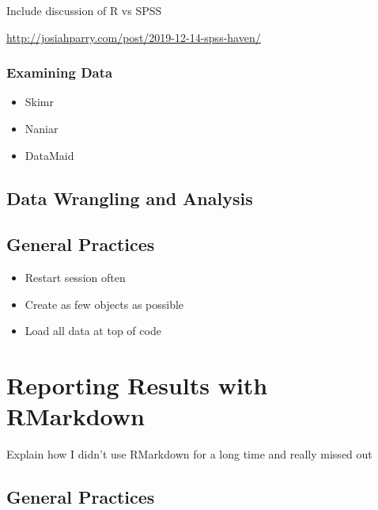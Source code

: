 \documentclass[]{book}
\providecommand{\tightlist}{%
  \setlength{\itemsep}{0pt}\setlength{\parskip}{0pt}}
\begin{document}
Include discussion of R vs SPSS

\url{http://josiahparry.com/post/2019-12-14-spss-haven/}

\hypertarget{examining-data}{%
\subsection{Examining Data}\label{examining-data}}

\begin{itemize}
\tightlist
\item
  Skimr
\item
  Naniar
\item
  DataMaid
\end{itemize}

\hypertarget{data-wrangling-and-analysis}{%
\section{Data Wrangling and Analysis}\label{data-wrangling-and-analysis}}

\hypertarget{general-practices}{%
\section{General Practices}\label{general-practices}}

\begin{itemize}
\tightlist
\item
  Restart session often\\
\item
  Create as few objects as possible\\
\item
  Load all data at top of code
\end{itemize}

\hypertarget{reporting-results-with-rmarkdown}{%
\chapter{Reporting Results with RMarkdown}\label{reporting-results-with-rmarkdown}}

Explain how I didn't use RMarkdown for a long time and really missed out

\hypertarget{general-practices-1}{%
\section{General Practices}\label{general-practices-1}}
\end{document}
